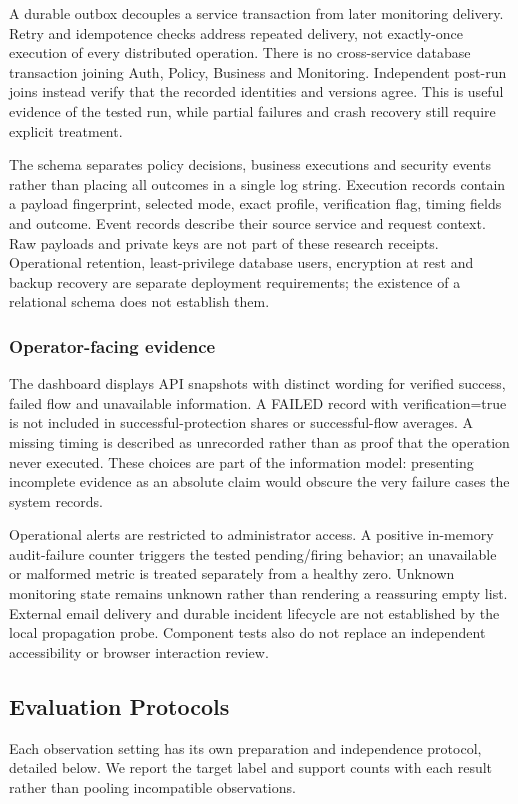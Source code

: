 \documentclass[conference,a4paper]{IEEEtran}
\begin{document}
A durable outbox decouples a service transaction from later monitoring delivery. Retry and idempotence checks address repeated delivery, not exactly-once execution of every distributed operation. There is no cross-service database transaction joining Auth, Policy, Business and Monitoring. Independent post-run joins instead verify that the recorded identities and versions agree. This is useful evidence of the tested run, while partial failures and crash recovery still require explicit treatment.

The schema separates policy decisions, business executions and security events rather than placing all outcomes in a single log string. Execution records contain a payload fingerprint, selected mode, exact profile, verification flag, timing fields and outcome. Event records describe their source service and request context. Raw payloads and private keys are not part of these research receipts. Operational retention, least-privilege database users, encryption at rest and backup recovery are separate deployment requirements; the existence of a relational schema does not establish them.

\subsubsection{Operator-facing evidence}
The dashboard displays API snapshots with distinct wording for verified success, failed flow and unavailable information. A FAILED record with verification=true is not included in successful-protection shares or successful-flow averages. A missing timing is described as unrecorded rather than as proof that the operation never executed. These choices are part of the information model: presenting incomplete evidence as an absolute claim would obscure the very failure cases the system records.

Operational alerts are restricted to administrator access. A positive in-memory audit-failure counter triggers the tested pending/firing behavior; an unavailable or malformed metric is treated separately from a healthy zero. Unknown monitoring state remains unknown rather than rendering a reassuring empty list. External email delivery and durable incident lifecycle are not established by the local propagation probe. Component tests also do not replace an independent accessibility or browser interaction review.

\subsection{Evaluation Protocols}
Each observation setting has its own preparation and independence protocol, detailed below. We report the target label and support counts with each result rather than pooling incompatible observations.
\end{document}
